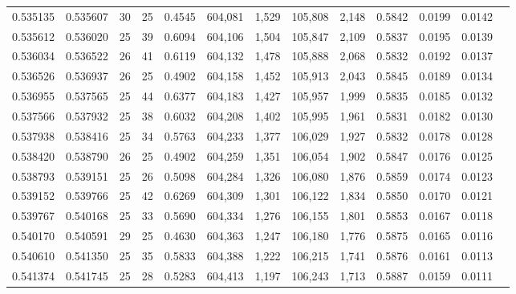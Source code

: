 \begin{tabular}{rrrrrrrrrrrrr}
0.535135 & 0.535607 &    30 &  25 &                                     0.4545 & 604,081 &   1,529 & 105,808 &   2,148 & 0.5842 & 0.0199 & 0.0142 \\
0.535612 & 0.536020 &    25 &  39 &                                     0.6094 & 604,106 &   1,504 & 105,847 &   2,109 & 0.5837 & 0.0195 & 0.0139 \\
0.536034 & 0.536522 &    26 &  41 &                                     0.6119 & 604,132 &   1,478 & 105,888 &   2,068 & 0.5832 & 0.0192 & 0.0137 \\
0.536526 & 0.536937 &    26 &  25 &                                     0.4902 & 604,158 &   1,452 & 105,913 &   2,043 & 0.5845 & 0.0189 & 0.0134 \\
0.536955 & 0.537565 &    25 &  44 &                                     0.6377 & 604,183 &   1,427 & 105,957 &   1,999 & 0.5835 & 0.0185 & 0.0132 \\
0.537566 & 0.537932 &    25 &  38 &                                     0.6032 & 604,208 &   1,402 & 105,995 &   1,961 & 0.5831 & 0.0182 & 0.0130 \\
0.537938 & 0.538416 &    25 &  34 &                                     0.5763 & 604,233 &   1,377 & 106,029 &   1,927 & 0.5832 & 0.0178 & 0.0128 \\
0.538420 & 0.538790 &    26 &  25 &                                     0.4902 & 604,259 &   1,351 & 106,054 &   1,902 & 0.5847 & 0.0176 & 0.0125 \\
0.538793 & 0.539151 &    25 &  26 &                                     0.5098 & 604,284 &   1,326 & 106,080 &   1,876 & 0.5859 & 0.0174 & 0.0123 \\
0.539152 & 0.539766 &    25 &  42 &                                     0.6269 & 604,309 &   1,301 & 106,122 &   1,834 & 0.5850 & 0.0170 & 0.0121 \\
0.539767 & 0.540168 &    25 &  33 &                                     0.5690 & 604,334 &   1,276 & 106,155 &   1,801 & 0.5853 & 0.0167 & 0.0118 \\
0.540170 & 0.540591 &    29 &  25 &                                     0.4630 & 604,363 &   1,247 & 106,180 &   1,776 & 0.5875 & 0.0165 & 0.0116 \\
0.540610 & 0.541350 &    25 &  35 &                                     0.5833 & 604,388 &   1,222 & 106,215 &   1,741 & 0.5876 & 0.0161 & 0.0113 \\
0.541374 & 0.541745 &    25 &  28 &                                     0.5283 & 604,413 &   1,197 & 106,243 &   1,713 & 0.5887 & 0.0159 & 0.0111 \\

\end{tabular}
